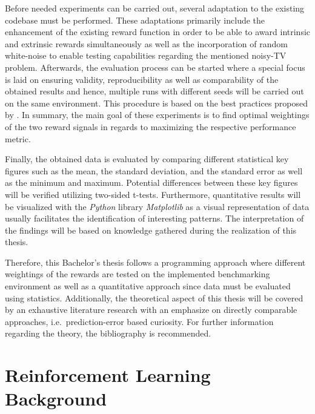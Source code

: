 \documentclass[draft,final]{vutinfth} %
\begin{document}
    Before needed experiments can be carried out, several adaptation to the existing codebase must be performed.
    These adaptations primarily include the enhancement of the existing reward function in order to be able to award intrinsic and extrinsic rewards simultaneously as well as the incorporation of random white-noise to enable testing capabilities regarding the mentioned noisy-TV problem.
    Afterwards, the evaluation process can be started where a special focus is laid on ensuring validity, reproducibility as well as comparability of the obtained results and hence, multiple runs with different seeds will be carried out on the same environment.
    This procedure is based on the best practices proposed by \citeauthor{francois-lavet_introduction_2018}.
    In summary, the main goal of these experiments is to find optimal weightings of the two reward signals in regards to maximizing the respective performance metric.

    Finally, the obtained data is evaluated by comparing different statistical key figures such as the mean, the standard deviation, and the standard error as well as the minimum and maximum.
    Potential differences between these key figures will be verified utilizing two-sided t-tests.
    Furthermore, quantitative results will be visualized with the \textit{Python} library \textit{Matplotlib} as a visual representation of data usually facilitates the identification of interesting patterns.
    The interpretation of the findings will be based on knowledge gathered during the realization of this thesis.

    Therefore, this Bachelor's thesis follows a programming approach where different weightings of the rewards are tested on the implemented benchmarking environment as well as a quantitative approach since data must be evaluated using statistics.
    Additionally, the theoretical aspect of this thesis will be covered by an exhaustive literature research with an emphasize on directly comparable approaches, i.e.\ prediction-error based curiosity.
    For further information regarding the theory, the bibliography is recommended.

    \glsresetall


    \chapter{Reinforcement Learning Background}\label{ch:reinforcement-learning-background}
\end{document}
